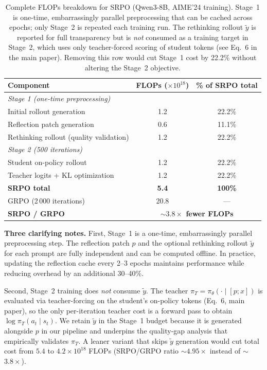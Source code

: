 \documentclass{article}
\newcommand{\method}{SRPO}
\theoremstyle{plain}
\theoremstyle{definition}
\theoremstyle{remark}
\begin{document}
\begin{table}[h]
\centering
\caption{Complete FLOPs breakdown for \method{} (Qwen3-8B, AIME'24 training). Stage~1 is one-time, embarrassingly parallel preprocessing that can be cached across epochs; only Stage~2 is repeated each training run. The rethinking rollout $\tilde{y}$ is reported for full transparency but is \emph{not} consumed as a training target in Stage~2, which uses only teacher-forced scoring of student tokens (see Eq.~6 in the main paper). Removing this row would cut Stage~1 cost by 22.2\% without altering the Stage~2 objective.}
\label{tab:flops_breakdown}
\vspace{0.5em}
\small
\begin{tabular}{@{}lcc@{}}
\toprule
\textbf{Component} & \textbf{FLOPs ($\times 10^{18}$)} & \textbf{\% of \method{} total} \\
\midrule
\multicolumn{3}{l}{\textit{Stage 1 (one-time preprocessing)}} \\
\quad Initial rollout generation        & 1.2 & 22.2\% \\
\quad Reflection patch generation       & 0.6 & 11.1\% \\
\quad Rethinking rollout (quality validation) & 1.2 & 22.2\% \\
\midrule
\multicolumn{3}{l}{\textit{Stage 2 (500 iterations)}} \\
\quad Student on-policy rollout         & 1.2 & 22.2\% \\
\quad Teacher logits + KL optimization  & 1.2 & 22.2\% \\
\midrule
\textbf{\method{} total}                & \textbf{5.4} & \textbf{100\%} \\
GRPO (2\,000 iterations)                & 20.8 & --- \\
\rowcolor{gray!15}
\textbf{\method{} / GRPO}               & \multicolumn{2}{c}{\textbf{$\sim$$3.8\times$ fewer FLOPs}} \\
\bottomrule
\end{tabular}
\end{table}

\textbf{Three clarifying notes.}
First, Stage~1 is a one-time, embarrassingly parallel preprocessing step. The reflection patch $p$ and the optional rethinking rollout $\tilde{y}$ for each prompt are fully independent and can be computed offline. In practice, updating the reflection cache every 2--3 epochs maintains performance while reducing overhead by an additional 30--40\%.

Second, Stage~2 training does \emph{not} consume $\tilde{y}$. The teacher $\pi_T=\pi_\theta(\cdot\mid[p;x])$ is evaluated via teacher-forcing on the student's on-policy tokens (Eq.~6, main paper), so the only per-iteration teacher cost is a forward pass to obtain $\log\pi_T(a_t\mid s_t)$. We retain $\tilde{y}$ in the Stage~1 budget because it is generated alongside $p$ in our pipeline and underpins the quality-gap analysis that empirically validates $\pi_T$. A leaner variant that skips $\tilde{y}$ generation would cut total cost from $5.4$ to $4.2\times 10^{18}$ FLOPs (SRPO/GRPO ratio $\sim$$4.95\times$ instead of $\sim$$3.8\times$).
\end{document}
